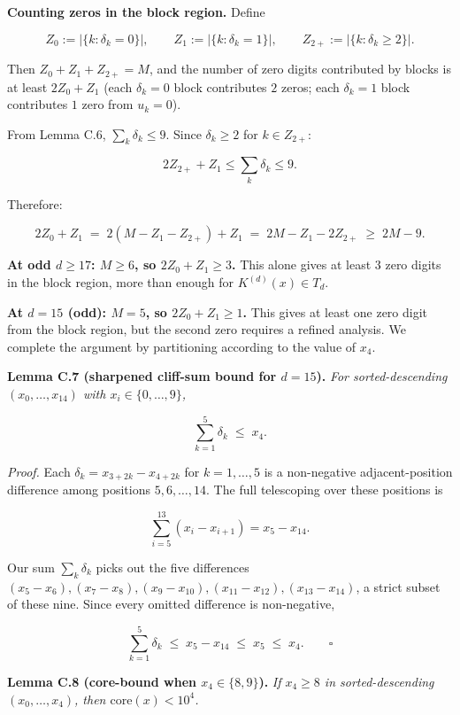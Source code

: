 \documentclass[11pt,letterpaper]{article}
\theoremstyle{paperstyle}
\theoremstyle{paperstyledef}
\theoremstyle{paperstylerem}
\begin{document}
\textbf{Counting zeros in the block region.} Define

\[Z_0 := \bigl|\{k : \delta_k = 0\}\bigr|, \qquad Z_1 := \bigl|\{k : \delta_k = 1\}\bigr|, \qquad Z_{2+} := \bigl|\{k : \delta_k \geq 2\}\bigr|.\]

Then \(Z_0 + Z_1 + Z_{2+} = M\), and the number of zero digits
contributed by blocks is at least \(2 Z_0 + Z_1\) (each \(\delta_k = 0\)
block contributes \(2\) zeros; each \(\delta_k = 1\) block contributes
\(1\) zero from \(u_k = 0\)).

From Lemma C.6, \(\sum_k \delta_k \leq 9\). Since \(\delta_k \geq 2\)
for \(k \in Z_{2+}\):

\[2 Z_{2+} + Z_1 \leq \sum_k \delta_k \leq 9.\]

Therefore:

\[2 Z_0 + Z_1 \;=\; 2(M - Z_1 - Z_{2+}) + Z_1 \;=\; 2M - Z_1 - 2 Z_{2+} \;\geq\; 2M - 9.\]

\textbf{At odd \(d \geq 17\): \(M \geq 6\), so \(2 Z_0 + Z_1 \geq 3\).}
This alone gives at least \(3\) zero digits in the block region, more
than enough for \(K^{(d)}(x) \in T_d\).

\textbf{At \(d = 15\) (odd): \(M = 5\), so \(2 Z_0 + Z_1 \geq 1\).} This
gives at least one zero digit from the block region, but the second zero
requires a refined analysis. We complete the argument by partitioning
according to the value of \(x_4\).

\textbf{Lemma C.7 (sharpened cliff-sum bound for \(d = 15\)).} \emph{For
sorted-descending \((x_0, \ldots, x_{14})\) with
\(x_i \in \{0, \ldots, 9\}\),}

\[\sum_{k = 1}^{5} \delta_k \;\leq\; x_4.\]

\emph{Proof.} Each \(\delta_k = x_{3 + 2k} - x_{4 + 2k}\) for
\(k = 1, \ldots, 5\) is a non-negative adjacent-position difference
among positions \(5, 6, \ldots, 14\). The full telescoping over these
positions is

\[\sum_{i = 5}^{13} (x_i - x_{i+1}) = x_5 - x_{14}.\]

Our sum \(\sum_k \delta_k\) picks out the five differences
\((x_5 - x_6), (x_7 - x_8), (x_9 - x_{10}), (x_{11} - x_{12}), (x_{13} - x_{14})\),
a strict subset of these nine. Since every omitted difference is
non-negative,

\[\sum_{k=1}^{5} \delta_k \;\leq\; x_5 - x_{14} \;\leq\; x_5 \;\leq\; x_4. \qquad \square\]

\textbf{Lemma C.8 (core-bound when \(x_4 \in \{8, 9\}\)).} \emph{If
\(x_4 \geq 8\) in sorted-descending \((x_0, \ldots, x_4)\), then
\(\mathrm{core}(x) < 10^4\).}
\end{document}
